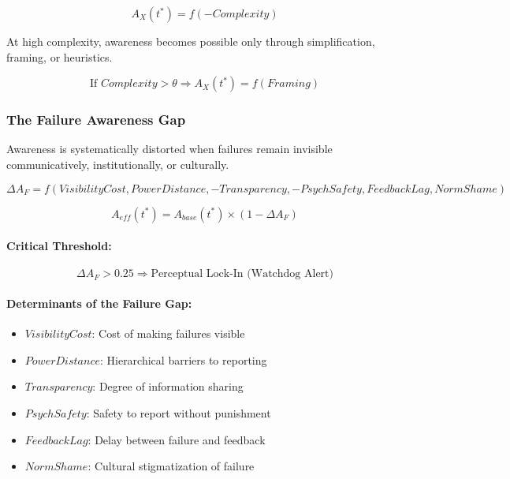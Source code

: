 \begin{equation}
A_X(t^*) = f(-Complexity)
\end{equation}

\begin{axiom}
\label{ax:awx-a47}
At high complexity, awareness becomes possible only through simplification, 
framing, or heuristics.
\end{axiom}

\begin{equation}
\text{If } Complexity > \theta \Rightarrow A_X(t^*) = f(Framing)
\end{equation}

\subsubsection{The Failure Awareness Gap}

\begin{axiom}
\label{ax:awx-a47a}
Awareness is systematically distorted when failures remain invisible 
communicatively, institutionally, or culturally.
\end{axiom}

\begin{equation}
\Delta A_F = f(VisibilityCost, PowerDistance, -Transparency, -PsychSafety, FeedbackLag, NormShame)
\end{equation}

\begin{equation}
A_{eff}(t^*) = A_{base}(t^*) \times (1 - \Delta A_F)
\end{equation}

\paragraph{Critical Threshold:}
\begin{equation}
\Delta A_F > 0.25 \Rightarrow \text{Perceptual Lock-In (Watchdog Alert)}
\end{equation}

\paragraph{Determinants of the Failure Gap:}
\begin{itemize}
\item $VisibilityCost$: Cost of making failures visible
\item $PowerDistance$: Hierarchical barriers to reporting
\item $Transparency$: Degree of information sharing
\item $PsychSafety$: Safety to report without punishment
\item $FeedbackLag$: Delay between failure and feedback
\item $NormShame$: Cultural stigmatization of failure
\end{itemize}

